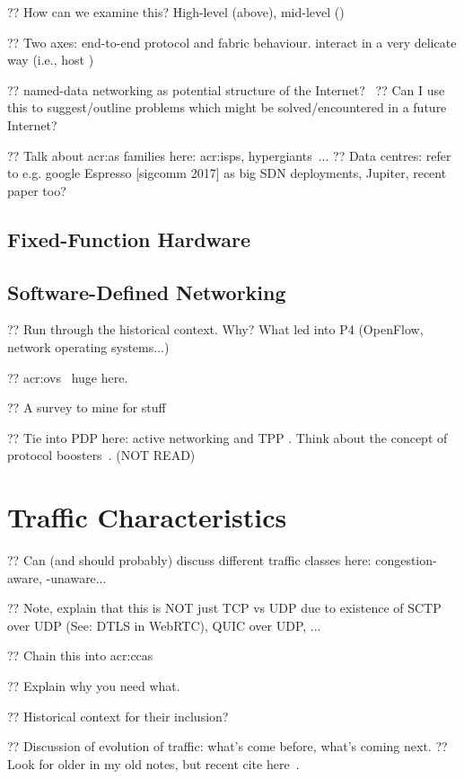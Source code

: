 ?? How can we examine this? High-level (above), mid-level ()

?? Two axes: end-to-end protocol and fabric behaviour. interact in a very delicate way (i.e., host )

?? named-data networking as potential structure of the Internet?~\parencite{DBLP:journals/ccr/0001ABJcCPWZ14}
?? Can I use this to suggest/outline problems which might be solved/encountered in a future Internet?

?? Talk about \gls{acr:as} families here: \glspl{acr:isp}, hypergiants~\parencite{DBLP:conf/sigcomm/GigisCMNKDKS21}...
?? Data centres: refer to e.g. google Espresso [sigcomm 2017] as big SDN deployments, Jupiter, recent paper too?

\subsection{Fixed-Function Hardware}

\subsection{Software-Defined Networking}

?? Run through the historical context. Why? What led into P4 (OpenFlow, network operating systems...)

?? \gls{acr:ovs}~\parencite{DBLP:conf/nsdi/PfaffPKJZRGWSSA15} huge here.

?? A survey to mine for stuff~\parencite{DBLP:journals/comsur/NunesMNOT14}

?? Tie into PDP here: active networking and TPP . Think about the concept of protocol boosters~\parencite{DBLP:journals/jsac/FeldmeierMSBMR98}. (NOT READ)

\section{Traffic Characteristics}

?? Can (and should probably) discuss different traffic classes here: congestion-aware, -unaware...

?? Note, explain that this is NOT just TCP vs UDP due to existence of SCTP over UDP (See: DTLS in WebRTC), QUIC over UDP, ...

?? Chain this into \glspl{acr:cca}

?? Explain why you need what.

?? Historical context for their inclusion?

?? Discussion of evolution of traffic: what's come before, what's coming next.
?? Look for older in my old notes, but recent cite here~\parencite{DBLP:conf/anrw/BauerJHBC21}.

